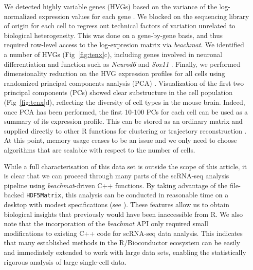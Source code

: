 \documentclass[10pt,letterpaper]{article}
\newcommand{\beachmat}{\textit{beachmat}}
\newcommand{\code}[1]{\texttt{#1}}
\begin{document}
We detected highly variable genes (HVGs) based on the variance of the log-normalized expression values for each gene \cite{lun2016stepbystep}.
We blocked on the sequencing library of origin for each cell to regress out technical factors of variation unrelated to biological heterogeneity.
This was done on a gene-by-gene basis, and thus required row-level access to the log-expresion matrix via \beachmat{}.
We identified a number of HVGs (Fig~\ref{fig:tenx}c), including genes involved in neuronal differentiation and function such as \textit{Neurod6} \cite{ kay2011neurod6} and \textit{Sox11} \cite{bergsland2006establishment}. 
Finally, we performed dimensionality reduction on the HVG expression profiles for all cells using randomized principal components analysis (PCA) \cite{halko2011finding}.
Visualization of the first two principal components (PCs) showed clear substructure in the cell population (Fig~\ref{fig:tenx}d), reflecting the diversity of cell types in the mouse brain.
Indeed, once PCA has been performed, the first 10-100 PCs for each cell can be used as a summary of its expression profile.
This can be stored as an ordinary matrix and supplied directly to other R functions for clustering \cite{xu2015identification,csardi2006igraph} or trajectory reconstruction \cite{trapnell2014dynamics}.
At this point, memory usage ceases to be an issue and we only need to choose algorithms that are scalable with respect to the number of cells.

While a full characterisation of this data set is outside the scope of this article, it is clear that we can proceed through many parts of the scRNA-seq analysis pipeline using \beachmat{}-driven C++ functions.
By taking advantage of the file-backed \code{HDF5Matrix}, this analysis can be conducted in reasonable time on a desktop with modest specifications (see \suppsecrealsystem{}).
These features allow us to obtain biological insights that previously would have been inaccessible from R.
We also note that the incorporation of the \beachmat{} API only required small modifications to existing C++ code for scRNA-seq data analysis.
This indicates that many established methods in the R/Bioconductor ecosystem can be easily and immediately extended to work with large data sets,
enabling the statistically rigorous analysis of large single-cell data.
\end{document}
